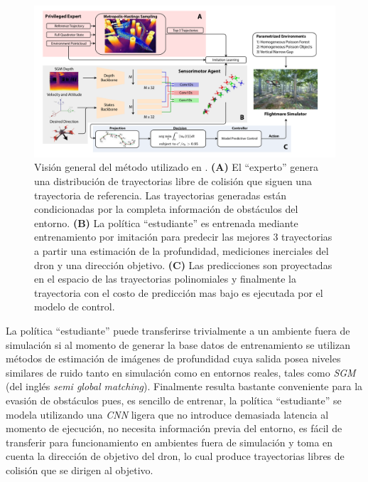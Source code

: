     \begin{figure}[H]
        \centering
        \includegraphics[scale=0.3]{partes/ImgJoao/agile-autonomy-overview.png}
        \caption[Visión general del método del método utilizado en \textit{Learning high-speed flight in the wild}]{Visión general del método utilizado en \cite{Loquercio2021}. \textbf{(A)} El ``experto'' genera una distribución de trayectorias libre de colisión que siguen una trayectoria de referencia. Las trayectorias generadas están condicionadas por la completa información de obstáculos del entorno. \textbf{(B)} La política ``estudiante'' es entrenada mediante entrenamiento por imitación para predecir las mejores 3 trayectorias a partir una estimación de la profundidad, mediciones inerciales del dron y una dirección objetivo. \textbf{(C)} Las predicciones son proyectadas en el espacio de las trayectorias polinomiales y finalmente la trayectoria con el costo de predicción mas bajo es ejecutada por el modelo de control. }
        \label{fig:agile-autonomy-overview}
    \end{figure}
    
    La política ``estudiante'' puede transferirse trivialmente a un ambiente fuera de simulación si al momento de generar la base datos de entrenamiento se utilizan métodos de estimación de imágenes de profundidad cuya salida posea niveles similares de ruido tanto en simulación como en entornos reales, tales como \textit{SGM} \cite{Hirschmüller2007} (del inglés \textit{semi global matching}). Finalmente  \cite{Loquercio2021} resulta bastante conveniente para la evasión de obstáculos pues, es sencillo de entrenar, la política ``estudiante'' se modela utilizando una \textit{CNN} ligera \cite{Howard2019} que no introduce demasiada latencia al momento de ejecución, no necesita información previa del entorno, es fácil de transferir para funcionamiento en ambientes fuera de simulación y toma en cuenta la dirección de objetivo del dron, lo cual produce trayectorias libres de colisión que se dirigen al objetivo.

